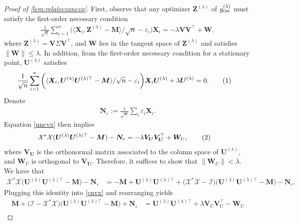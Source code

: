 \documentclass[10pt,a4paper]{amsart}
\newcommand{\eps}{\ensuremath{\varepsilon}}
\newcommand\numberthis{\addtocounter{equation}{1}\tag{\theequation}}
\newcommand{\s}{^*}
\renewcommand{\t}{^{\top}}
\begin{document}
\begin{proof}[Proof of \cref{lem:relatecvxncvx}]
    First, observe that any  optimizer $\bm{Z}^{(\lambda)}$ of $g^{(\lambda)}_{{\sf cvx}}$ must satisfy the first-order necessary condition
\begin{align}
  \frac{1}{\sqrt{n}} \sum_{i=1}^{n} \bigg( \langle \bm{X}_i, \bm{Z}^{(\lambda)} - \bm{M} \rangle /\sqrt{n} - \eps_i \bigg) \bm{X}_i = -\lambda \bm{VV}\t + \bm{W},
\end{align}
where $\bm{Z}^{(\lambda)} = \bm{V} \Sigma \bm{V}\t$, and $\bm{W}$ lies in the tangent space of $\bm{Z}^{(\lambda)}$ and satisfies $\|\bm{W} \| \leq \lambda $.  In addition, from the first-order necessary condition for a stationary point, $\bm{U}^{(\lambda)}$ satisfies
\begin{align}
   \frac{1}{\sqrt{n}} \sum_{i=1}^{n} \bigg( \langle \bm{X}_i, \bm{U}^{(\lambda)}\bm{U}^{(\lambda)\top} - \bm{M} \rangle/\sqrt{n} - \eps_i \bigg) \bm{X}_i \bm{U}^{(\lambda)} + \lambda \bm{U}^{(\lambda)} &= 0. \numberthis \label{uncvx}
\end{align}
Denote
\begin{align}
    \bm{N}_{\eps} := \frac{1}{\sqrt{n}}\sum_i \eps_i \bm{X}_i.
\end{align}
Equation \cref{uncvx} then implies 
\begin{align}
\mathcal{X}\s \mathcal{X}( \bm{U}^{(\lambda)} \bm{U}^{(\lambda)\top} - \bm{M} ) - \bm{N}_{\eps} &= 
    -\lambda \bm{V}_{\bm{U}} \bm{V}_{\bm{U}}\t + \bm{W}_{U}, \numberthis \label{cnvx}
\end{align}
where $\bm{V}_{{\bm{U}}}$ is the orthonormal matrix associated to the column space of $\bm{U}^{{(\lambda)}}$, and $\bm{W}_U$ is orthogonal to $\bm{V}_{{\bm{U}}}$.  Therefore, it suffices to show that $\|\bm{W}_U \| < \lambda$.  
We have that 
\begin{align}
\mathcal{X}\s \mathcal{X} \big( \bm{U}^{(\lambda)} \bm{U}^{(\lambda)\top} - \bm{M} \big) - \bm{N}_{\eps} &= 
 -\bm{M} + \bm{U}^{(\lambda)}\bm{U}^{(\lambda)\top} + \bigg( \mathcal{X}\s \mathcal{X} - \mathcal{I} \bigg) \big( \bm{U}^{(\lambda)}\bm{U}^{(\lambda)\top} - \bm{M}  \big) - \bm{N}_{\eps}.
\end{align}
Plugging this identity into \eqref{cnvx} and rearranging yields
\begin{align}
    \bm{M} + \bigg( \mathcal{I} - \mathcal{X}\s \mathcal{X}  \bigg) \big( \bm{U}^{(\lambda)}\bm{U}^{(\lambda)\top} - \bm{M}  \big) + \bm{N}_{\eps} &=  \bm{U}^{(\lambda)}\bm{U}^{(\lambda)\top} + \lambda \bm{V}_{U} \bm{V}_U\t - \bm{W}_U \\

\end{align}
\end{proof}
\end{document}
